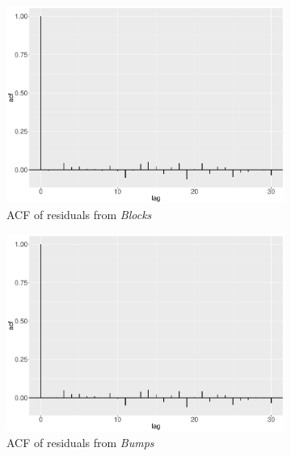 \begin{figure}[!ht]
    \centering
    \begin{subfigure}{0.45\textwidth}
    \centering
    \includegraphics[width=\textwidth]{Chapters/02TractorSplineTheory/plot/ggplot/ggacfBlocks3.pdf}
    \caption{ACF of residuals from \textit{Blocks}}
    \end{subfigure}%
    \begin{subfigure}{0.45\textwidth}
    \centering
    \includegraphics[width=\textwidth]{Chapters/02TractorSplineTheory/plot/ggplot/ggacfBumps3.pdf}
    \caption{ACF of residuals from \textit{Bumps}}
    \end{subfigure}
    \begin{subfigure}{0.45\textwidth}
    \centering

\end{subfigure}
\end{figure}

